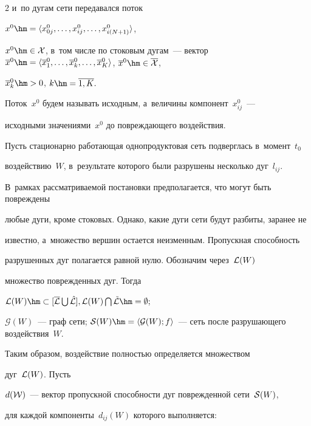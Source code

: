 \begin{multicols}{2}
и~по дугам сети передавался поток 


$x^0\hm= \langle x_{0j}^0,\ldots, x_{ij}^0,\ldots, x_{i(N+1)}^0\rangle$, 


$x^0 \hm\in {\cal X}$, в~том числе по стоковым дугам~--- вектор  $\overline x^0 


\hm= \langle \overline x_1^0, \ldots, \overline x_k^0,\ldots,  


\overline x_K^0\rangle$, $\overline x^0 \hm\in \overline{\cal X}$, 


$\overline x_k^0 \hm> 0$, $k \hm= \overline{1, K}.$


Поток~$x^0$ будем называть исходным, а~величины компонент~$x_{ij}^0$~--- 


исходными значениями~$x^0$ до повреждающего воздействия.





Пусть стационарно работающая однопродуктовая сеть подверглась в~момент~$t_0$ 


воздействию~$W$, в~результате которого были разрушены несколько дуг~$l_{ij}$. 


В~рамках рассматриваемой постановки предполагается, что могут быть повреждены 


любые дуги, кроме стоковых. Однако, какие дуги сети будут разбиты, заранее не 


известно, а~множество вершин  остается неизменным. Пропускная способность 


разрушенных дуг полагается равной нулю. Обозначим через~${\cal L}(W)$ 


множество по\-вреж\-ден\-ных дуг. Тогда


${\cal L}(W) \hm\subset [\overline{\cal L} \bigcup \hat {\cal L}], 


{\cal L}(W) \bigcap  \tilde{\cal L}\hm = \emptyset;$


${\mathcal{G}}(W)$~--- граф сети; ${\cal S}(W) \hm= \langle {\mathcal{G}}(W); 


f \rangle$~--- сеть после разрушающего воздействия~$W$.


Таким образом, воздействие полностью определяется множеством 


дуг~${\cal L}(W)$. Пусть


$d({\cal W})$~--- вектор пропускной способности дуг поврежденной сети~${\cal S}(W)$,  


для каждой компоненты~$d_{ij}(W)$ которого выполняется:


\begin{multline}



\end{multline}
\end{multicols}
